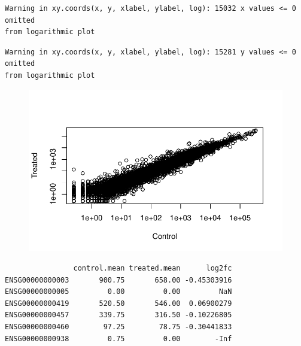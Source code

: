 \documentclass[
  letterpaper,
  DIV=11,
  numbers=noendperiod]{scrartcl}
\newenvironment{Shaded}{\begin{snugshade}}{\end{snugshade}}
\newcommand{\CommentTok}[1]{\textcolor[rgb]{0.37,0.37,0.37}{#1}}
\newcommand{\FunctionTok}[1]{\textcolor[rgb]{0.28,0.35,0.67}{#1}}
\newcommand{\NormalTok}[1]{\textcolor[rgb]{0.00,0.23,0.31}{#1}}
\newcommand{\OtherTok}[1]{\textcolor[rgb]{0.00,0.23,0.31}{#1}}
\newcommand{\SpecialCharTok}[1]{\textcolor[rgb]{0.37,0.37,0.37}{#1}}
\newcommand{\StringTok}[1]{\textcolor[rgb]{0.13,0.47,0.30}{#1}}
\begin{document}
\begin{verbatim}
Warning in xy.coords(x, y, xlabel, ylabel, log): 15032 x values <= 0 omitted
from logarithmic plot
\end{verbatim}

\begin{verbatim}
Warning in xy.coords(x, y, xlabel, ylabel, log): 15281 y values <= 0 omitted
from logarithmic plot
\end{verbatim}

\begin{figure}[H]

{\centering \includegraphics{12writeup_files/figure-pdf/unnamed-chunk-10-1.pdf}

}

\end{figure}

\begin{Shaded}
\end{Shaded}

\begin{verbatim}
                control.mean treated.mean      log2fc
ENSG00000000003       900.75       658.00 -0.45303916
ENSG00000000005         0.00         0.00         NaN
ENSG00000000419       520.50       546.00  0.06900279
ENSG00000000457       339.75       316.50 -0.10226805
ENSG00000000460        97.25        78.75 -0.30441833
ENSG00000000938         0.75         0.00        -Inf
\end{verbatim}
\end{document}
